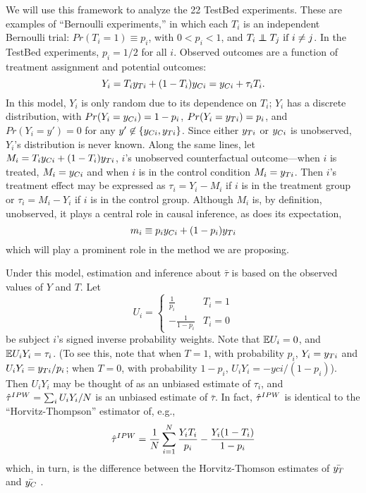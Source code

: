 We will use this framework to analyze the 22 TestBed experiments.
These are examples of ``Bernoulli experiments,'' in
which each $T_i$ is an
independent Bernoulli trial: $Pr(T_i=1)\equiv p_i$, with $0<p_i<1$, and
$T_i\independent T_j \text{ if } i\ne j$.
In the TestBed experiments,
$p_i=1/2$ for all $i$.
Observed outcomes are a function of treatment assignment and
potential outcomes:
\begin{equation*}
  Y_i=T_iy_{Ti}+(1-T_i)y_{Ci}=y_{Ci}+\tau_iT_i.
\end{equation*}
In this model, $Y_i$ is only random due to its dependence on $T_i$;
$Y_i$ has a discrete distribution, with $Pr(Y_i=y_{Ci})=1-p_i$,
$Pr(Y_i=y_{Ti})=p_i$, and $Pr(Y_i=y')=0$ for any
$y'\not\in\{y_{Ci},y_{Ti}\}$.
Since either $y_{Ti}$ or $y_{Ci}$ is unobserved, $Y_i$'s distribution is never known.
Along the same lines, let $M_i=T_iy_{Ci}+(1-T_i)y_{Ti}$, $i$'s unobserved
counterfactual outcome---when $i$ is treated, $M_i=y_{Ci}$ and when $i$
is in the control condition $M_i=y_{Ti}$.
Then $i$'s treatment effect may be expressed as $\tau_i=Y_i-M_i$ if
$i$ is in the treatment group or $\tau_i=M_i-Y_i$ if $i$ is in the
control group.
Although $M_i$ is, by definition, unobserved, it plays a central role in
causal inference, as does its expectation,
\begin{equation*}
m_i\equiv p_iy_{Ci}+(1-p_i)y_{Ti}
\end{equation*}
which will play a prominent role in the method we are proposing.

Under this model, estimation and inference about $\bar{\tau}$ is based on
the observed values of $Y$ and $T$.
Let
\begin{equation*}
U_i=\begin{cases}
\frac{1}{p_i} & T_i=1\\
-\frac{1}{1-p_i} & T_i=0
\end{cases}
\end{equation*}
be subject $i$'s signed inverse probability weights.
Note that $\mathbb{E} U_i=0$, and $\mathbb{E} U_iY_i=\tau_i$.
(To see this, note that when $T=1$, with probability $p_i$,
$Y_i=y_{Ti}$ and $U_iY_i=y_{Ti}/p_i$; when $T=0$, with probability
$1-p_i$, $U_iY_i=-yci/(1-p_i)$).
Then $U_iY_i$ may be thought of as an unbiased estimate of $\tau_i$, and $\hat{\tau}^{IPW}=\sum_iU_iY_i/N$ is an unbiased estimate
of $\bar{\tau}$.
In fact, $\hat{\tau}^{IPW}$ is identical to the ``Horvitz-Thompson'' estimator
of, e.g., \citet{aronowMiddleton}
\begin{equation*}
\hat{\tau}^{IPW}=\frac{1}{N}\displaystyle\sum_{i=1}^N
\frac{Y_iT_i}{p_i}-\frac{Y_i(1-T_i)}{1-p_i}
\end{equation*}
which, in turn, is the difference between the Horvitz-Thomson
estimates of $\bar{y_T}$ and $\bar{y_C}$ \citep{horvitzThompson}.

